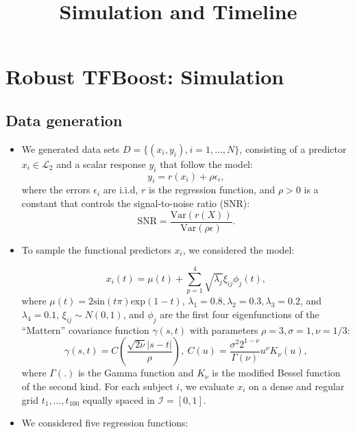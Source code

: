 \documentclass{article}
\title{Simulation and Timeline}
\begin{document}
\maketitle


\section{Robust TFBoost: Simulation}
\subsection{Data generation}
\begin{itemize}
    \item We generated data sets $D = \{(x_i, y_i), i = 1,..., N\}$, consisting of a predictor $x_i\in\mathcal{L}_2$ and a scalar response $y_i$ that follow the model: 
 \begin{equation} \label{eq:gen}
y_i = r(x_i) + \rho \epsilon_i,
\end{equation}
where the errors $\epsilon_i$ are i.i.d, $r$ is the regression function,  and  $\rho > 0$ is a constant that controls the signal-to-noise ratio (SNR): 
$$\text{SNR} = \frac{\text{Var}(r(X))}{\text{Var}(\rho\epsilon)}.$$
\item To sample the functional predictors $x_i$, we considered the model:

\begin{equation} \label{eq:xmodel}
    x_i(t) = \mu(t) + \sum_{p=1}^4 \sqrt{\lambda_j}\xi_{ij}\phi_j(t),
\end{equation}
where $\mu(t) = 2\text{sin}(t\pi) \text{exp}(1-t)$, $\lambda_1 = 0.8, \lambda_2 = 0.3, \lambda_3 = 0.2$, and $\lambda_4 = 0.1$,  $\xi_{ij}\sim N(0,1) $,  and $\phi_j$ are the first four eigenfunctions of the ``Mattern'' covariance function $\gamma(s,t)$ with parameters $\rho = 3, \sigma = 1, \nu = 1/3$: 
 $$\gamma(s,t) = C\left(\frac{\sqrt{2\nu}|s-t|}{\rho}\right), \ C(u) = \frac{\sigma^2 2^{1-\nu}}{\Gamma(\nu)} u^{\nu} K_{\nu}(u),$$
  where $\Gamma(.)$ is the Gamma function and $K_{\nu}$ is the modified Bessel function of the second kind. For each subject $i$, we evaluate $x_i$ on a dense and regular grid $t_1,..., t_{100}$ equally spaced in $\mathcal{I} = [0,1]$. 
\item We considered five regression functions:
\begin{itemize}


\end{itemize}
\end{itemize}
\end{document}
